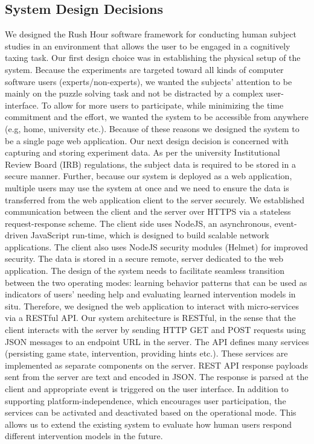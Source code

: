 \subsection*{System Design Decisions}
We designed the Rush Hour software framework for conducting human subject studies in an environment that allows the user to be engaged in a cognitively taxing task. Our first design choice was in establishing the physical setup of the system. Because the experiments are targeted toward all kinds of computer software users (experts/non-experts), we wanted the subjects' attention to be mainly on the puzzle solving task and not be distracted by a complex user-interface. To allow for more users to participate, while minimizing the time commitment and the effort, we wanted the system to be accessible from anywhere (e.g, home, university etc.). Because of these reasons we designed the system to be a single page web application.
Our next design decision is concerned with capturing and storing experiment data. As per the university Institutional Review Board (IRB) regulations, the subject data is required to be stored in a secure manner. Further, because our system is deployed as a web application, multiple users may use the system at once and we need to ensure the data is transferred from the web application client to the server securely. We established communication between the client and the server over HTTPS via a stateless request-response scheme. The client side uses NodeJS, an asynchronous, event-driven JavaScript run-time, which is designed to build scalable network applications.  The client also uses NodeJS security modules (Helmet) for improved security. The data is stored in a secure remote, server dedicated to the web application. The design of the system needs to facilitate seamless transition between the two operating modes: learning behavior patterns that can be used as indicators of users' needing help and evaluating learned intervention models in situ. Therefore,  we designed the web application to interact with micro-services via a RESTful API. Our system architecture is RESTful, in the sense that the client interacts with the server by sending HTTP GET and POST requests using JSON messages to an endpoint URL in the server. The API defines many services (persisting game state, intervention, providing hints etc.). These services are implemented as separate components on the server. REST API response payloads sent from the server are text and encoded in JSON. The response is parsed at the client and appropriate event is triggered on the user interface. In addition to supporting platform-independence, which encourages user participation, the services can be activated and deactivated based on the operational mode. This allows us to extend the existing system to evaluate how human users respond different intervention models in the future.

